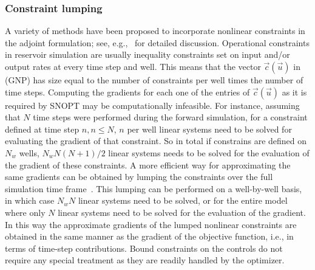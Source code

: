 \documentclass[twocolumn,numbook]{svjour3}          %
\def\u{{\vec u}}
\def\c{{\vec c}}
\begin{document}
\subsubsection{Constraint lumping}

A variety of methods have been proposed to
incorporate nonlinear constraints in the adjoint formulation; see,
e.g.,~\cite{Brouwer:2004,Pallav:2006,Pallav:2008,Jansen:2011} for detailed discussion. 
Operational constraints in reservoir simulation are usually inequality constraints set on 
input and/or output rates at every time step and well.  
This means that the vector $\c(\u)$ in (GNP) has size equal to the 
number of constraints per well times the number of time steps. Computing the gradients
for each one of the entries of  $\c(\u)$ as it is required by SNOPT may be
computationally infeasible. For instance, assuming that $N$ time steps were 
performed during the forward simulation, for a constraint defined at time step $n, n \le N$,
$n$ per well linear systems need to be solved for evaluating the gradient of that 
constraint. So in total if constrains are defined on $N_w$ wells, 
$N_w N (N+1)/2$ linear systems needs to be solved for the evaluation of the gradient
of these constraints. A more efficient way for approximating the same  gradients 
can be obtained by lumping the constraints over the full simulation time frame~\cite{Pallav:2008}. 
This lumping can be performed on a well-by-well basis, in which case $N_w N$ linear systems 
need to be solved, or for the entire model where only $N$ linear systems need to be solved
for the evaluation of the gradient. In this way the approximate gradients of the lumped
nonlinear constraints are obtained in the same manner as the gradient of the
objective function, i.e., in terms of time-step contributions.
Bound constraints on the controls do not require any special treatment as they are readily handled by the optimizer.
\end{document}
